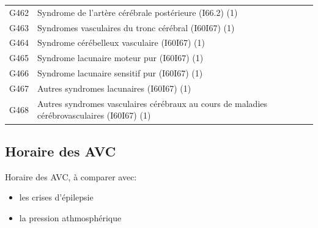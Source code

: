 \documentclass[12pt,english,french,twoside]{book}\usepackage[]{graphicx}\usepackage[]{color}
\begin{document}
{\begin{longtable}{|l|l|}
 G462 & Syndrome de l'artère cérébrale postérieure (I66.2) (1) \\
 G463 & Syndromes vasculaires du tronc cérébral (I60I67) (1) \\
 G464 & Syndrome cérébelleux vasculaire (I60I67) (1) \\
 G465 & Syndrome lacunaire moteur pur (I60I67) (1) \\
 G466 & Syndrome lacunaire sensitif pur (I60I67) (1) \\
 G467 & Autres syndromes lacunaires (I60I67) (1) \\
 G468 & Autres syndromes vasculaires cérébraux au cours de maladies cérébrovasculaires (I60I67) (1) \\
  \hline
\end{longtable}
} %




\subsection*{Horaire des AVC}

Horaire des AVC, à comparer avec:
\begin{itemize}
  \item les crises d'épilepsie
  \item la pression athmosphérique
\end{itemize}
\end{document}
